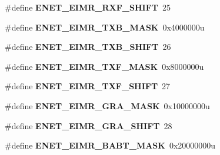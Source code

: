 \begin{DoxyCompactItemize}
\item 
\#define {\bfseries E\+N\+E\+T\+\_\+\+E\+I\+M\+R\+\_\+\+R\+X\+F\+\_\+\+S\+H\+I\+FT}~25\hypertarget{group__ENET__Register__Masks_ga78a295cf5fe590daeb081dafd03a9155}{}\label{group__ENET__Register__Masks_ga78a295cf5fe590daeb081dafd03a9155}

\item 
\#define {\bfseries E\+N\+E\+T\+\_\+\+E\+I\+M\+R\+\_\+\+T\+X\+B\+\_\+\+M\+A\+SK}~0x4000000u\hypertarget{group__ENET__Register__Masks_ga9fddede3e716f3928faff0eb39509275}{}\label{group__ENET__Register__Masks_ga9fddede3e716f3928faff0eb39509275}

\item 
\#define {\bfseries E\+N\+E\+T\+\_\+\+E\+I\+M\+R\+\_\+\+T\+X\+B\+\_\+\+S\+H\+I\+FT}~26\hypertarget{group__ENET__Register__Masks_gac105b6e74a6dea995d1aba52557c6652}{}\label{group__ENET__Register__Masks_gac105b6e74a6dea995d1aba52557c6652}

\item 
\#define {\bfseries E\+N\+E\+T\+\_\+\+E\+I\+M\+R\+\_\+\+T\+X\+F\+\_\+\+M\+A\+SK}~0x8000000u\hypertarget{group__ENET__Register__Masks_ga82cff30c63a5da6e1c8f258ec2ba58b6}{}\label{group__ENET__Register__Masks_ga82cff30c63a5da6e1c8f258ec2ba58b6}

\item 
\#define {\bfseries E\+N\+E\+T\+\_\+\+E\+I\+M\+R\+\_\+\+T\+X\+F\+\_\+\+S\+H\+I\+FT}~27\hypertarget{group__ENET__Register__Masks_gab7b9fcb8d862613d25705d25cde3bc2d}{}\label{group__ENET__Register__Masks_gab7b9fcb8d862613d25705d25cde3bc2d}

\item 
\#define {\bfseries E\+N\+E\+T\+\_\+\+E\+I\+M\+R\+\_\+\+G\+R\+A\+\_\+\+M\+A\+SK}~0x10000000u\hypertarget{group__ENET__Register__Masks_gab98df36a19739e86d31288f174b02808}{}\label{group__ENET__Register__Masks_gab98df36a19739e86d31288f174b02808}

\item 
\#define {\bfseries E\+N\+E\+T\+\_\+\+E\+I\+M\+R\+\_\+\+G\+R\+A\+\_\+\+S\+H\+I\+FT}~28\hypertarget{group__ENET__Register__Masks_gaf521660efa515ae8165bfae1239c623d}{}\label{group__ENET__Register__Masks_gaf521660efa515ae8165bfae1239c623d}

\item 
\#define {\bfseries E\+N\+E\+T\+\_\+\+E\+I\+M\+R\+\_\+\+B\+A\+B\+T\+\_\+\+M\+A\+SK}~0x20000000u\hypertarget{group__ENET__Register__Masks_gae9646ae2a082e18adeb6a1c2e654a821}{}\label{group__ENET__Register__Masks_gae9646ae2a082e18adeb6a1c2e654a821}


\end{DoxyCompactItemize}
